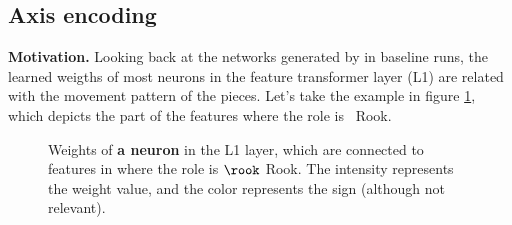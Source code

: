 \subsection{Axis encoding}
\label{sec:axis_encoding}

\textbf{Motivation.} Looking back at the networks generated by  in baseline runs, the learned weigths of most neurons in the feature transformer layer (L1) are related with the movement pattern of the pieces. Let's take the example in figure \ref{fig:rook_weights}, which depicts the  part of the features where the role is \symrook\ Rook.

\begin{figure}[h]
\centering
{}%
\qquad
{}%
\caption{Weights of \textbf{a neuron} in the L1 layer, which are connected to features in  where the role is $\rook$ Rook. The intensity represents the weight value, and the color represents the sign (although not relevant).}
\label{fig:rook_weights}
\end{figure}

